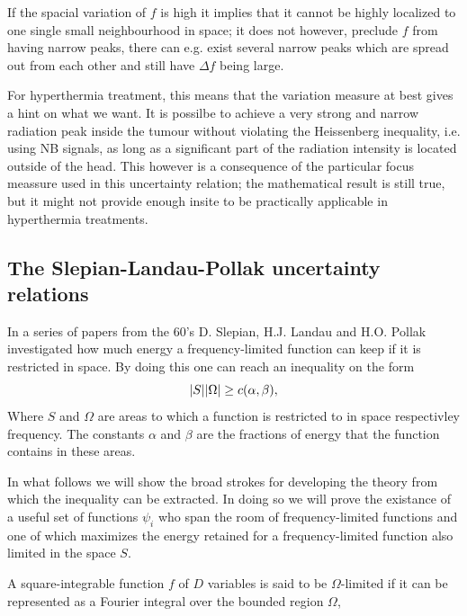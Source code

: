 \documentclass[11pt,a4paper, 
swedish,english %
]{article}
\begin{document}
If the spacial variation of $f$ is high it implies that it cannot be
highly localized to one single small neighbourhood in space; it does not
however, preclude $f$ from having narrow peaks, there can e.g. exist
several narrow peaks which are spread out from each other and still
have $\Delta{f}$ being large.

For hyperthermia treatment, this means that the variation measure at
best gives a hint on what we want. It is possilbe to achieve a very
strong and narrow radiation peak inside the tumour without violating
the Heissenberg inequality, i.e. using NB signals, as long as a
significant part of the radiation intensity is located outside of the 
head.  
This however is a consequence of the particular focus meassure used in
this uncertainty relation; the mathematical result is still true, but
it might not provide enough insite to be practically applicable in
hyperthermia treatments.



\subsection{The Slepian-Landau-Pollak uncertainty relations}
In a series of papers from the 60's D. Slepian, H.J. Landau and H.O. Pollak investigated how much energy a frequency-limited function can keep if it is restricted in space. By doing this one can reach an inequality on the form
\begin{equation}
\abs{S}\abs{\Omega} \geq c(\alpha,\beta),
\end{equation}
Where $S$ and $\Omega$ are areas to which a function is restricted to in space respectivley frequency. The constants $\alpha$ and $\beta$ are the fractions of energy that the function contains in these areas. 

In what follows we will show the broad strokes for developing the theory from which the inequality can be extracted. In doing so we will prove the existance of a useful set of functions ${\psi_i}$ who span the room of frequency-limited functions and one of which maximizes the energy retained for a frequency-limited function also limited in the space $S$.

A square-integrable function $f$ of $D$ variables is said to be $\Omega$-limited if it can be represented as a Fourier integral over the bounded region $\Omega$,
\end{document}
